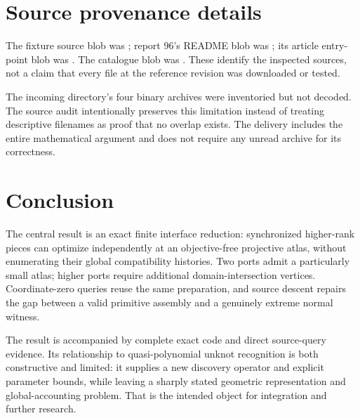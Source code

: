 \section{Source provenance details}
The fixture source blob was ; report 96's README blob was ; its article entry-point blob was . The catalogue blob was . These identify the inspected sources, not a claim that every file at the reference revision was downloaded or tested.

The incoming directory's four binary archives were inventoried but not decoded. The source audit intentionally preserves this limitation instead of treating descriptive filenames as proof that no overlap exists. The delivery includes the entire mathematical argument and does not require any unread archive for its correctness.

\section{Conclusion}
The central result is an exact finite interface reduction: synchronized higher-rank pieces can optimize independently at an objective-free projective atlas, without enumerating their global compatibility histories. Two ports admit a particularly small atlas; higher ports require additional domain-intersection vertices. Coordinate-zero queries reuse the same preparation, and source descent repairs the gap between a valid primitive assembly and a genuinely extreme normal witness.

The result is accompanied by complete exact code and direct source-query evidence. Its relationship to quasi-polynomial unknot recognition is both constructive and limited: it supplies a new discovery operator and explicit parameter bounds, while leaving a sharply stated geometric representation and global-accounting problem. That is the intended object for integration and further research.

